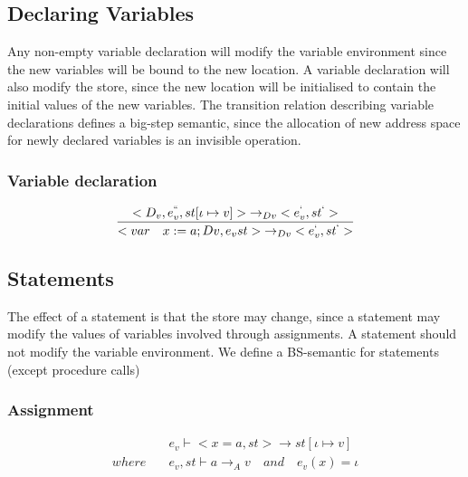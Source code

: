 \subsection*{Declaring Variables}
Any non-empty variable declaration will modify the variable environment since the new variables will be bound to the new location.
A variable declaration will also modify the store, since the new location will be initialised to contain the initial values of the new variables.
The transition relation describing variable declarations defines a big-step semantic, since the allocation of new address space for newly declared variables is an invisible operation.

\subsubsection{Variable declaration}
\begin{equation}
	\frac { <{ D }_{ v },{ e }_{ v }^{ `` },st[\iota \mapsto v]>{ \rightarrow  }_{ Dv }<{ e }_{ v }^{ ` },{ st }^{ ` }> }{ <var\quad x:=a;Dv,{ e }_{ v }st>{ \rightarrow  }_{ Dv }<{ e }_{ v }^{ ` },{ st }^{ ` }> }
\end{equation}

\subsection*{Statements}
The effect of a statement is that the store may change, since a statement may modify the values of variables involved through assignments.
A statement should not modify the variable environment.
We define a BS-semantic for statements (except procedure calls) 

\subsubsection{Assignment}
\begin{align*}
	&{ e }_{ v }\vdash <x=a,st>\rightarrow st[\iota \mapsto v]\\
	where\quad &{ e }_{ v },st\vdash a{ \rightarrow  }_{ A }v\quad and\quad  { e }_{ v }(x)=\iota 
\end{align*}

